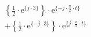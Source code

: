 \[
\begin{split}
&   \left \{ \frac{1}{2} \cdot \textrm{e}^{\{  j \cdot 3 \}} \right \} \cdot \textrm{e}^{\{-j \cdot \frac{\pi}{2} \cdot t \}}\\
&+  \left \{ \frac{1}{2} \cdot \textrm{e}^{\{ -j \cdot 3 \}} \right \} \cdot \textrm{e}^{\{ j \cdot \frac{\pi}{2} \cdot t \}}\\
\end{split}
\]
